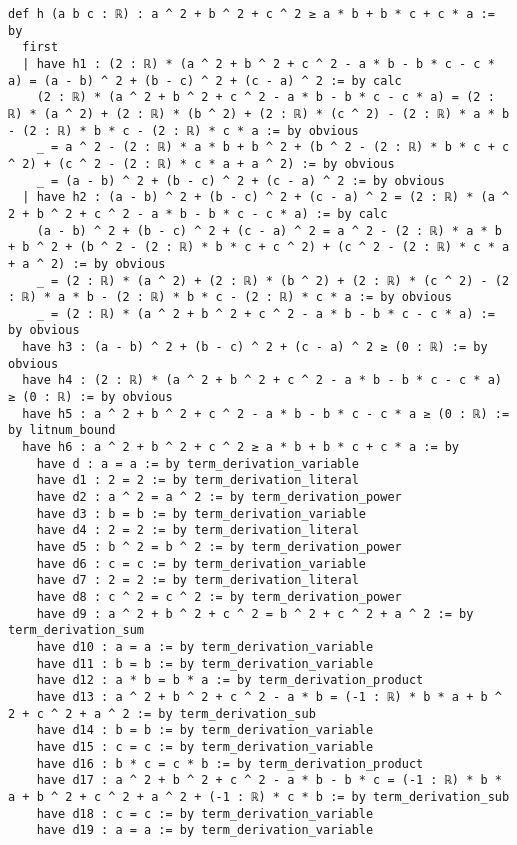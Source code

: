 \documentclass{article}
\begin{document}
\begin{tcolorbox}[colback=white!10, width=\linewidth]
\begin{lstlisting}[language=Lean4]
def h (a b c : ℝ) : a ^ 2 + b ^ 2 + c ^ 2 ≥ a * b + b * c + c * a := by
  first
  | have h1 : (2 : ℝ) * (a ^ 2 + b ^ 2 + c ^ 2 - a * b - b * c - c * a) = (a - b) ^ 2 + (b - c) ^ 2 + (c - a) ^ 2 := by calc
    (2 : ℝ) * (a ^ 2 + b ^ 2 + c ^ 2 - a * b - b * c - c * a) = (2 : ℝ) * (a ^ 2) + (2 : ℝ) * (b ^ 2) + (2 : ℝ) * (c ^ 2) - (2 : ℝ) * a * b - (2 : ℝ) * b * c - (2 : ℝ) * c * a := by obvious
    _ = a ^ 2 - (2 : ℝ) * a * b + b ^ 2 + (b ^ 2 - (2 : ℝ) * b * c + c ^ 2) + (c ^ 2 - (2 : ℝ) * c * a + a ^ 2) := by obvious
    _ = (a - b) ^ 2 + (b - c) ^ 2 + (c - a) ^ 2 := by obvious
  | have h2 : (a - b) ^ 2 + (b - c) ^ 2 + (c - a) ^ 2 = (2 : ℝ) * (a ^ 2 + b ^ 2 + c ^ 2 - a * b - b * c - c * a) := by calc
    (a - b) ^ 2 + (b - c) ^ 2 + (c - a) ^ 2 = a ^ 2 - (2 : ℝ) * a * b + b ^ 2 + (b ^ 2 - (2 : ℝ) * b * c + c ^ 2) + (c ^ 2 - (2 : ℝ) * c * a + a ^ 2) := by obvious
    _ = (2 : ℝ) * (a ^ 2) + (2 : ℝ) * (b ^ 2) + (2 : ℝ) * (c ^ 2) - (2 : ℝ) * a * b - (2 : ℝ) * b * c - (2 : ℝ) * c * a := by obvious
    _ = (2 : ℝ) * (a ^ 2 + b ^ 2 + c ^ 2 - a * b - b * c - c * a) := by obvious
  have h3 : (a - b) ^ 2 + (b - c) ^ 2 + (c - a) ^ 2 ≥ (0 : ℝ) := by obvious
  have h4 : (2 : ℝ) * (a ^ 2 + b ^ 2 + c ^ 2 - a * b - b * c - c * a) ≥ (0 : ℝ) := by obvious
  have h5 : a ^ 2 + b ^ 2 + c ^ 2 - a * b - b * c - c * a ≥ (0 : ℝ) := by litnum_bound
  have h6 : a ^ 2 + b ^ 2 + c ^ 2 ≥ a * b + b * c + c * a := by
    have d : a = a := by term_derivation_variable
    have d1 : 2 = 2 := by term_derivation_literal
    have d2 : a ^ 2 = a ^ 2 := by term_derivation_power
    have d3 : b = b := by term_derivation_variable
    have d4 : 2 = 2 := by term_derivation_literal
    have d5 : b ^ 2 = b ^ 2 := by term_derivation_power
    have d6 : c = c := by term_derivation_variable
    have d7 : 2 = 2 := by term_derivation_literal
    have d8 : c ^ 2 = c ^ 2 := by term_derivation_power
    have d9 : a ^ 2 + b ^ 2 + c ^ 2 = b ^ 2 + c ^ 2 + a ^ 2 := by term_derivation_sum
    have d10 : a = a := by term_derivation_variable
    have d11 : b = b := by term_derivation_variable
    have d12 : a * b = b * a := by term_derivation_product
    have d13 : a ^ 2 + b ^ 2 + c ^ 2 - a * b = (-1 : ℝ) * b * a + b ^ 2 + c ^ 2 + a ^ 2 := by term_derivation_sub
    have d14 : b = b := by term_derivation_variable
    have d15 : c = c := by term_derivation_variable
    have d16 : b * c = c * b := by term_derivation_product
    have d17 : a ^ 2 + b ^ 2 + c ^ 2 - a * b - b * c = (-1 : ℝ) * b * a + b ^ 2 + c ^ 2 + a ^ 2 + (-1 : ℝ) * c * b := by term_derivation_sub
    have d18 : c = c := by term_derivation_variable
    have d19 : a = a := by term_derivation_variable

\end{lstlisting}
\end{tcolorbox}
\end{document}
